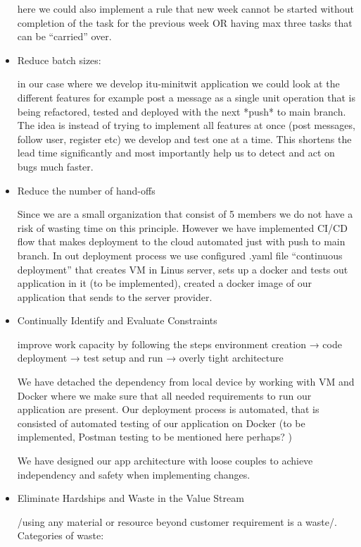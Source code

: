 \documentclass{article}
\begin{document}
\begin{itemize}
here we could also implement a rule that new week cannot be started without completion of the task for the previous week OR having max three tasks that can be “carried” over.

\item  Reduce batch sizes:

in our case where we develop itu-minitwit application we could look at the different features for example post a message as a single unit operation that is being refactored, tested and deployed with the next *push* to main branch. The idea is instead of  trying to implement all features at once (post messages, follow user, register etc) we develop and test one at a time. This shortens the lead time significantly and most importantly help us to detect and act on bugs much faster.

\item  Reduce the number of hand-offs

Since we are a small organization that consist of 5 members we do not have a risk of wasting time on this principle. However we have implemented CI/CD flow that makes deployment to the cloud automated just with push to main branch. In out deployment process we use configured .yaml file “continuous deployment” that creates VM in Linus server, sets up a docker and tests out application in it (to be implemented), created a docker image of our application that sends to the server provider.

\item Continually Identify and Evaluate Constraints

improve work capacity by following the steps environment creation → code deployment → test setup and run → overly tight architecture

We have detached the dependency from local device by working with VM and Docker where we make sure that all needed requirements to run our application are present. Our deployment process is automated, that is consisted of automated testing of our application on Docker (to be implemented, Postman testing to be mentioned here perhaps? )

We have designed our app architecture with loose couples to achieve independency and safety when implementing changes.

\item Eliminate Hardships and Waste in the Value Stream

/using any material or resource beyond customer requirement is a waste/. Categories of waste: 


\end{itemize}
\end{document}
